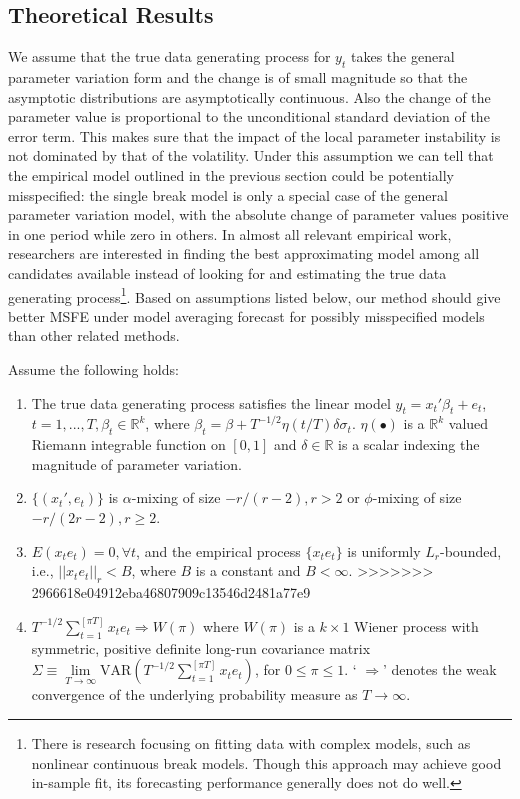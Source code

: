 \begin{assumption}
\begin{enumerate}
\subsection{Theoretical Results}
We assume that the true data generating process for $y_t$ takes the general parameter variation form and the change is of small magnitude so that the asymptotic distributions are asymptotically continuous. Also the change of the parameter value is proportional to the unconditional standard deviation of the error term. This makes sure that the impact of the local parameter instability is not dominated by that of the volatility. Under this assumption we can tell that the empirical model outlined in the previous section could be potentially misspecified: the single break model is only a special case of the general parameter variation model, with the absolute change of parameter values positive in one period while zero in others. In almost all relevant empirical work, researchers are interested in finding the best approximating model among all candidates available instead of looking for and estimating the true data generating process\footnote{There is research focusing on fitting data with complex models, such as nonlinear continuous break models. Though this approach may achieve good in-sample fit, its forecasting performance generally does not do well.}. Based on assumptions listed below, our method should give better MSFE under model averaging forecast for possibly misspecified models than other related methods.
\begin{Assumption}\label{asump:1}
Assume the following holds:
\begin{enumerate}
	\item The true data generating process satisfies the linear model $y_t = x_t'\beta_t + e_t$, $t=1,...,T,\beta_t \in \mathbb{R}^k$, where $\beta_t = \beta + T^{-1/2}\eta(t/T)\delta\sigma_t$. $\eta(\bullet)$ is a $\mathbb{R}^k$ valued Riemann integrable function on $[0,1]$ and $\delta \in \mathbb{R}$ is a scalar indexing the magnitude of parameter variation.
	\item $\{(x_t',e_t)\}$ is $\alpha$-mixing of size $-r/(r-2),r > 2$ or $\phi$-mixing of size $-r/(2r-2),r \geq 2$.
    \item $E(x_t e_t) = 0, \forall t$, and the empirical process $\{x_t e_t\}$ is uniformly $L_r$-bounded, i.e., $||x_t e_t||_{r} < B$, where $B$ is a constant and $B < \infty$.
>>>>>>> 2966618e04912eba46807909c13546d2481a77e9
    \item $T^{-1/2}\sum_{t=1}^{[\pi T]} x_t e_t \Rightarrow W(\pi)$ where $W(\pi)$ is a $k \times 1$ Wiener process with symmetric, positive definite long-run covariance matrix $\Sigma \equiv \lim\limits_{T\to \infty}\mathrm{VAR}(T^{-1/2}\sum_{t=1}^{[\pi T]} x_t e_t)$, for $0 \leq \pi \leq 1$. ` $\Rightarrow$' denotes the weak convergence of the underlying probability measure as $T \to \infty$.

\end{enumerate}
\end{Assumption}
\end{enumerate}
\end{assumption}
